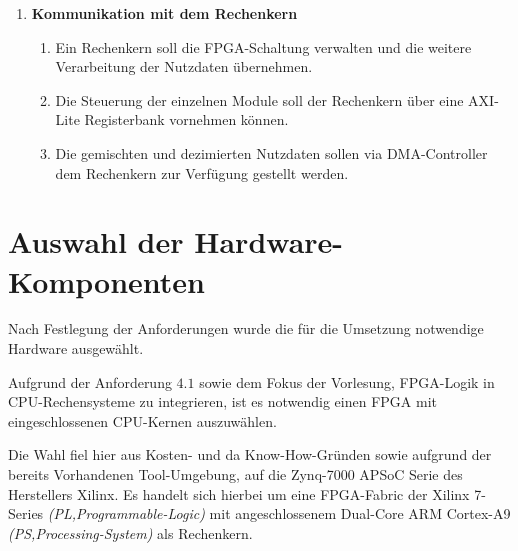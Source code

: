 \begin{enumerate}
	\item \textbf{Kommunikation mit dem Rechenkern}
	\begin{enumerate}[label*=\arabic*.]
		\item Ein Rechenkern soll die \acs{FPGA}-Schaltung verwalten und die weitere Verarbeitung der Nutzdaten übernehmen.
		\item Die Steuerung der einzelnen Module soll der Rechenkern über eine \acs{AXI}-Lite Registerbank vornehmen können.
		\item Die gemischten und dezimierten Nutzdaten sollen via \acl{DMA}-Controller dem Rechenkern zur Verfügung gestellt werden.
	\end{enumerate}
\end{enumerate}


\section{Auswahl der Hardware-Komponenten}
Nach Festlegung der Anforderungen wurde die für die Umsetzung notwendige Hardware ausgewählt.

Aufgrund der Anforderung $4.1$ sowie dem Fokus der Vorlesung, FPGA-Logik in \acs{CPU}-Rechensysteme zu integrieren, 
ist es notwendig einen \acs{FPGA} mit eingeschlossenen \acs{CPU}-Kernen auszuwählen.

Die Wahl fiel hier aus Kosten- und da Know-How-Gründen sowie aufgrund der bereits Vorhandenen Tool-Umgebung, auf die Zynq-7000 \acs{APSoC} Serie des Herstellers Xilinx.
Es handelt sich hierbei um eine \acs{FPGA}-Fabric der Xilinx 7-Series \textit{(PL,Programmable-Logic)} mit angeschlossenem Dual-Core ARM Cortex-A9 \textit{(PS,Processing-System)}
als Rechenkern.

